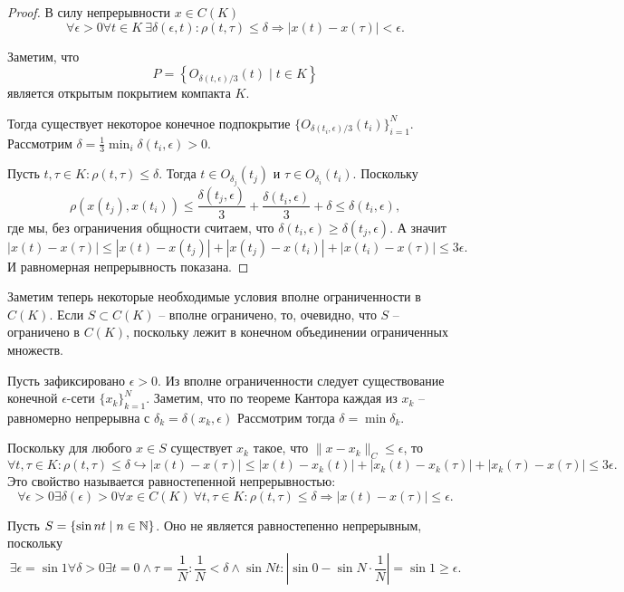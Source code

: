 \begin{proof}
    В силу непрерывности $x \in C(K)$
    \[
        \forall \epsilon > 0 \forall t \in K \  \exists \delta(\epsilon, t)\colon \rho(t, \tau) \leq \delta \Rightarrow |x(t) - x(\tau)| < \epsilon.
    \]

    Заметим, что
    \[
        P = \left\{O_{\delta(t, \epsilon)/3}(t) \mid t \in K\right\}
    \]
    является открытым покрытием компакта $K$.

    Тогда существует некоторое конечное подпокрытие $\{O_{\delta(t_i, \epsilon)/3}(t_i)\}_{i = 1}^{N}$.
    Рассмотрим $\delta = \frac{1}{3}\min_{i} \delta(t_i, \epsilon) > 0$.

    Пусть $t, \tau \in K\colon \rho(t, \tau) \leq \delta$.
    Тогда $t \in O_{\delta_j}(t_j)$ и $\tau \in O_{\delta_i}(t_i)$.
    Поскольку
    \[
        \rho(x(t_j), x(t_i)) \leq \frac{\delta(t_j, \epsilon)}{3} + \frac{\delta(t_i, \epsilon)}{3} + \delta \leq \delta(t_i, \epsilon),
    \]
    где мы, без ограничения общности считаем, что $\delta(t_i, \epsilon) \geq \delta(t_j, \epsilon)$.
    А значит
    \[
        |x(t) - x(\tau)| \leq |x(t) - x(t_j)| + |x(t_j) - x(t_i)| + |x(t_i) - x(\tau)| \leq 3\epsilon.
    \]
    И равномерная непрерывность показана.
\end{proof}
\begin{note}
    Заметим теперь некоторые необходимые условия вполне ограниченности в $C(K)$.
    Если $S \subset C(K)$ -- вполне ограничено, то, очевидно, что $S$ -- ограничено в $C(K)$, поскольку лежит в конечном объединении ограниченных множеств.

    Пусть зафиксировано $\epsilon > 0$.
    Из вполне ограниченности следует существование конечной $\epsilon$-сети $\{x_k\}_{k = 1}^{N}$.
    Заметим, что по теореме Кантора каждая из $x_k$ -- равномерно непрерывна с $\delta_k = \delta(x_k, \epsilon)$
    Рассмотрим тогда $\delta = \min \delta_k$.

    Поскольку для любого $x \in S$ существует $x_k$ такое, что $\|x - x_k\|_C \leq \epsilon$, то
    \[
        \forall t, \tau \in K\colon \rho(t, \tau) \leq \delta \hookrightarrow |x(t) - x(\tau)| \leq |x(t) - x_k(t)| + |x_k(t) - x_k(\tau)| + |x_k(\tau) - x(\tau)| \leq 3\epsilon.
    \]
    Это свойство называется равностепенной непрерывностью:
    \[
        \forall \epsilon > 0 \exists \delta(\epsilon) > 0 \forall x \in C(K) \ \forall t, \tau \in K \colon \rho(t, \tau) \leq \delta \Rightarrow |x(t) - x(\tau)| \leq \epsilon.
    \]
\end{note}
\begin{example}
    Пусть $S = \{\sin nt \mid n \in \mathbb{N}\}$.
    Оно не является равностепенно непрерывным, поскольку
    \[
        \exists \epsilon = \sin 1 \forall \delta > 0 \exists t = 0 \wedge \tau = \frac{1}{N}\colon \frac{1}{N} < \delta \wedge \sin Nt\colon |\sin 0 - \sin N \cdot \frac{1}{N}| = \sin 1 \geq \epsilon.
    \]
\end{example}

